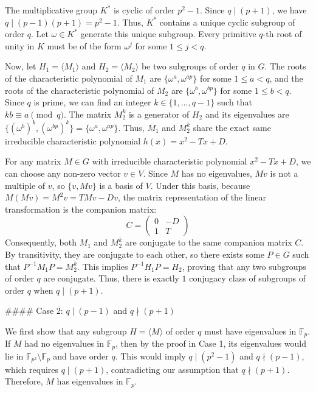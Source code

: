 The multiplicative group $K^*$ is cyclic of order $p^2-1$. Since $q \mid (p+1)$, we have $q \mid (p-1)(p+1) = p^2-1$. Thus, $K^*$ contains a unique cyclic subgroup of order $q$. Let $\omega \in K^*$ generate this unique subgroup. Every primitive $q$-th root of unity in $K$ must be of the form $\omega^j$ for some $1 \leqslant j < q$. 

Now, let $H_1 = \langle M_1 \rangle$ and $H_2 = \langle M_2 \rangle$ be two subgroups of order $q$ in $G$. The roots of the characteristic polynomial of $M_1$ are $\{\omega^a, \omega^{ap}\}$ for some $1 \leqslant a < q$, and the roots of the characteristic polynomial of $M_2$ are $\{\omega^b, \omega^{bp}\}$ for some $1 \leqslant b < q$. Since $q$ is prime, we can find an integer $k \in \{1, \dots, q-1\}$ such that $kb \equiv a \pmod q$. The matrix $M_2^k$ is a generator of $H_2$ and its eigenvalues are $\{(\omega^b)^k, (\omega^{bp})^k\} = \{\omega^a, \omega^{ap}\}$. Thus, $M_1$ and $M_2^k$ share the exact same irreducible characteristic polynomial $h(x) = x^2 - Tx + D$.

For any matrix $M \in G$ with irreducible characteristic polynomial $x^2 - Tx + D$, we can choose any non-zero vector $v \in V$. Since $M$ has no eigenvalues, $Mv$ is not a multiple of $v$, so $\{v, Mv\}$ is a basis of $V$. Under this basis, because $M(Mv) = M^2 v = TMv - Dv$, the matrix representation of the linear transformation is the companion matrix:
$$C = \begin{pmatrix} 0 & -D \\ 1 & T \end{pmatrix}$$
Consequently, both $M_1$ and $M_2^k$ are conjugate to the same companion matrix $C$. By transitivity, they are conjugate to each other, so there exists some $P \in G$ such that $P^{-1} M_1 P = M_2^k$. This implies $P^{-1} H_1 P = H_2$, proving that any two subgroups of order $q$ are conjugate. Thus, there is exactly $1$ conjugacy class of subgroups of order $q$ when $q \mid (p+1)$.

#### Case 2: $q \mid (p-1)$ and $q \nmid (p+1)$

We first show that any subgroup $H = \langle M \rangle$ of order $q$ must have eigenvalues in $\mathbb{F}_p$. If $M$ had no eigenvalues in $\mathbb{F}_p$, then by the proof in Case 1, its eigenvalues would lie in $\mathbb{F}_{p^2} \setminus \mathbb{F}_p$ and have order $q$. This would imply $q \mid (p^2-1)$ and $q \nmid (p-1)$, which requires $q \mid (p+1)$, contradicting our assumption that $q \nmid (p+1)$. Therefore, $M$ has eigenvalues in $\mathbb{F}_p$. 

